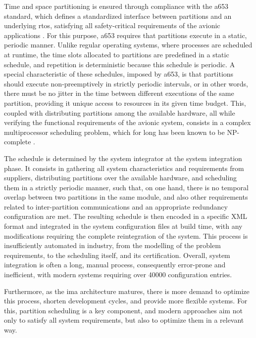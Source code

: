 \documentclass[main.tex]{subfiles}
\begin{document}
Time and space partitioning is ensured through compliance with the \gls{a653} standard, which defines a standardized interface between partitions and an underlying \gls{rtos}, satisfying all safety-critical requirements of the avionic applications \cite{prisaznuk2008arinc}.
For this purpose, \gls{a653} requires that partitions execute in a static, periodic manner.
Unlike regular operating systems, where processes are scheduled at runtime, the time slots allocated to partitions are predefined in a static schedule, and repetition is deterministic because this schedule is periodic.
A special characteristic of these schedules, imposed by \gls{a653}, is that partitions should execute non-preemptively in strictly periodic intervals, or in other words, there must be no jitter in the time between different executions of the same partition, providing it unique access to resources in its given time budget.
This, coupled with distributing partitions among the available hardware, all while verifying the functional requirements of the avionic system, consists in a complex multiprocessor scheduling problem, which for long has been known to be NP-complete \cite{korst1996scheduling}.

The schedule is determined by the system integrator at the system integration phase.
It consists in gathering all system characteristics and requirements from suppliers, distributing partitions over the available hardware, and scheduling them in a strictly periodic manner, such that, on one hand, there is no temporal overlap between two partitions in the same module, and also other requirements related to inter-partition communications and an appropriate redundancy configuration are met.
The resulting schedule is then encoded in a specific XML format and integrated in the system configuration files at build time, with any modifications requiring the complete reintegration of the system.
This process is insufficiently automated in industry, from the modelling of the problem requirements, to the scheduling itself, and its certification.
Overall, system integration is often a long, manual process, consequently error-prone and inefficient, with modern systems requiring over \num{40000} configuration entries.

Furthermore, as the \gls{ima} architecture matures, there is more demand to optimize this process, shorten development cycles, and provide more flexible systems.
For this, partition scheduling is a key component, and modern approaches aim not only to satisfy all system requirements, but also to optimize them in a relevant way.
\end{document}
